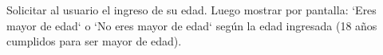 ﻿
Solicitar al usuario el ingreso de su edad. Luego mostrar por pantalla: `Eres mayor de edad` o `No eres mayor de edad` según la edad ingresada (18 años cumplidos para ser mayor de edad).



\volverindice
\newpage
